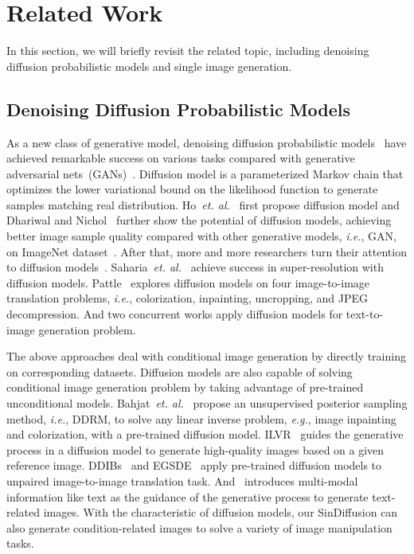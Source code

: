 \documentclass[10pt,twocolumn,letterpaper]{article}
\begin{document}
\section{Related Work}

In this section, we will briefly revisit the related topic, including denoising diffusion probabilistic models and single image generation.

\subsection{Denoising Diffusion Probabilistic Models}
As a new class of generative model, denoising diffusion probabilistic models~\cite{dhariwal2021diffusion} have achieved remarkable success on various tasks compared with generative adversarial nets~(GANs)~\cite{goodfellow2014generative}.
Diffusion model is a parameterized Markov chain that optimizes the lower variational bound on the likelihood function to generate samples matching real distribution.
Ho~\emph{et. al.}~\cite{ho2020denoising} first propose diffusion model and Dhariwal and Nichol~\cite{dhariwal2021diffusion} further show the potential of diffusion models, achieving better image sample quality compared with other generative models, \emph{i.e.}, GAN, on ImageNet dataset~\cite{deng2009imagenet}.
After that, more and more researchers turn their attention to diffusion models~\cite{nichol2021improved, song2020denoising, gu2021vector, saharia2021image, nichol2021glide, saharia2021palette, li2022srdiff, sasaki2021unit, kim2021diffusionclip, meng2021sdedit, ho2021classifier, lugmayr2022repaint, ho2022cascaded, kingma2021variational, kong2021fast, san2021noise, austin2021structured}.
Saharia~\emph{et. al.}~\cite{saharia2021image} achieve success in super-resolution with diffusion models.
Pattle~\cite{saharia2021palette} explores diffusion models on four image-to-image translation problems, \emph{i.e.}, colorization, inpainting, uncropping, and JPEG decompression.
And two concurrent works \cite{gu2021vector,nichol2021glide} apply diffusion models for text-to-image generation problem.

The above approaches deal with conditional image generation by directly training on corresponding datasets.
Diffusion models are also capable of solving conditional image generation problem by taking advantage of pre-trained unconditional models.
Bahjat~\emph{et. al.}~\cite{kawar2022denoising} propose an unsupervised posterior sampling method, \emph{i.e.}, DDRM, to solve any linear inverse problem, \emph{e.g.}, image inpainting and colorization, with a pre-trained diffusion model.
ILVR~\cite{choi2021ilvr} guides the generative process in a diffusion model to generate high-quality images based on a given reference image.
DDIBs~\cite{su2022dual} and EGSDE~\cite{zhao2022egsde} apply pre-trained diffusion models to unpaired image-to-image translation task. 
And~\cite{avrahami2021blended} introduces multi-modal information like text as the guidance of the generative process to generate text-related images.
With the characteristic of diffusion models, our SinDiffusion can also generate condition-related images to solve a variety of image manipulation tasks.
\end{document}
